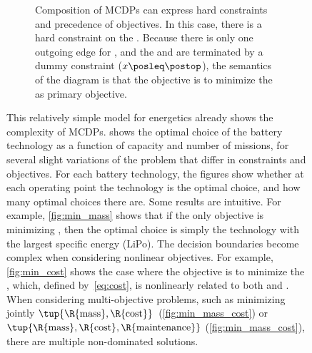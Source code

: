 \begin{figure*}[p]
\begin{figure}
    \caption{
        Composition of MCDPs can express hard constraints and precedence of objectives.
        In this case, there is a hard constraint on the .
        Because there is only one outgoing edge for , and the  and  are terminated by a dummy constraint ($x\posleq\postop$), the semantics of the diagram is that the objective is to minimize the  as primary objective.
    }
\end{figure}

This relatively simple model for energetics already shows the complexity of MCDPs.
 shows the optimal choice of the battery technology as a function of capacity and number of missions, for several slight variations of the problem that differ in constraints and objectives.
For each battery technology, the figures show whether at each operating point the technology is the optimal choice, and how many optimal choices there are.
Some results are intuitive.
For example, \cref{fig:min_mass} shows that if the only objective is minimizing , then the optimal choice is simply the technology with the largest specific energy (LiPo).
The decision boundaries become complex when considering nonlinear objectives.
For example, \cref{fig:min_cost} shows the case where the objective is to minimize the , which, defined by~\cref{eq:cost}, is nonlinearly related to both  and .
When considering multi-objective problems, such as minimizing jointly $\tup{ \R{\text{mass}},\R{\text{cost}}} $~(\cref{fig:min_mass_cost}) or~$\tup{ \R{\text{mass}},\R{\text{cost}},\R{\text{maintenance}}} $ (\cref{fig:min_mass_cost}), there are multiple non-dominated solutions.

\begin{figure*}
    \begin{centering}


\end{centering}
\end{figure*}
\end{figure*}
